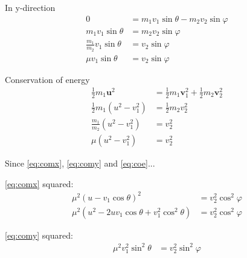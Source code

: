 \documentclass[twoside,english]{uiofysmaster/uiofysmaster}
\let\orgautoref\autoref
\renewcommand{\autoref}
        {\def\equationautorefname{Eq.}%
         \def\figureautorefname{Fig.}%
         \def\subfigureautorefname{Fig.}%
         \def\sectionautorefname{Sec.}%
         \def\subsectionautorefname{Sec.}%
         \def\subsubsectionautorefname{Sec.}%
         \def\Itemautorefname{item}%
         \def\tableautorefname{Tab.}%
         \orgautoref}
\begin{document}
\begin{appendices}
In y-direction
\begin{align}\label{eq:comy}
	0 &= m_1 v_1 \sin \theta - m_2 v_2 \sin \varphi \nonumber\\
	m_1 v_1 \sin \theta &= m_2 v_2 \sin \varphi \nonumber\\
	\frac{m_1}{m_2} v_1 \sin \theta &= v_2 \sin \varphi \nonumber\\
	\mu v_1 \sin \theta &= v_2 \sin \varphi
\end{align}

Conservation of energy
\begin{align}\label{eq:coe}
	\tfrac{1}{2} m_1 \boldsymbol{u}^2 &= \tfrac{1}{2} m_1 \boldsymbol{v}_1^2 + \tfrac{1}{2} m_2 \boldsymbol{v}_2^2 \nonumber\\
	\tfrac{1}{2} m_1 (u^2 - v_1^2) &= \tfrac{1}{2} m_2 v_2^2 \nonumber\\
	\frac{m_1}{m_2} (u^2 - v_1^2) &= v_2^2 \nonumber\\
	\mu (u^2 - v_1^2) &= v_2^2
\end{align}

Since \autoref{eq:comx}, \autoref{eq:comy} and \autoref{eq:coe}...

\autoref{eq:comx} squared:
\begin{align*}%
	\mu^2 (u - v_1 \cos \theta)^2 &= v_2^2 \cos^2 \varphi  \\
	\mu^2 (u^2 - 2uv_1 \cos \theta + v_1^2 \cos^2 \theta) &= v_2^2 \cos^2 \varphi
\end{align*}

\autoref{eq:comy} squared:
\begin{align*}%
	\mu^2 v_1^2 \sin^2 \theta &= v_2^2 \sin^2 \varphi
\end{align*}


\end{appendices}
\end{document}
